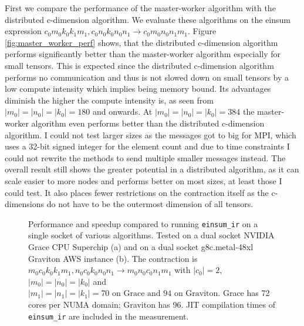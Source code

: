 First we compare the performance of the master-worker algorithm with the distributed c-dimension algorithm.
We evaluate these algorithms on the einsum expression $c_0m_0k_0k_1m_1, c_0n_0k_0n_0n_1 \rightarrow c_0m_0n_0n_1m_1$.
Figure \ref{fig:master_worker_perf} shows, that the distributed c-dimension algorithm performs significantly better than the master-worker algorithm especially for small tensors.
This is expected since the distributed c-dimension algorithm performs no communication and thus is not slowed down on small tensors by a low compute intensity which implies being memory bound.
Its advantages diminish the higher the compute intensity is, as seen from $|m_0|=|n_0|=|k_0|= 180$ and onwards.
At $|m_0|=|n_0|=|k_0|= 384$ the master-worker algorithm even performs better than the distributed c-dimension algorithm.
I could not test larger sizes as the messages got to big for MPI, which uses a 32-bit signed integer for the element count and due to time constraints I could not rewrite the methods to send multiple smaller messages instead.
The overall result still shows the greater potential in a distributed algorithm, as it can scale easier to more nodes and performs better on most sizes, at least those I could test.
It also places fewer restrictions on the contraction itself as the c-dimensions do not have to be the outermost dimension of all tensors.

\begin{figure}[ht]
  \centering
    \begin{subfigure}[t]{1\textwidth}
      
    \end{subfigure}
  \caption{
    Performance and speedup compared to running \texttt{einsum\_ir} on a single socket of various algorithms.
    Tested on a dual socket NVIDIA Grace CPU Superchip (a) and on a dual socket g8c.metal-48xl Graviton AWS instance (b).
    The contraction is $m_0c_0k_0k_1m_1, n_0c_0k_0n_0n_1 \rightarrow m_0n_0c_0n_1m_1$ with $|c_0|=2$, $|m_0|=|n_0|=|k_0|$ and $|m_1|=|n_1|=|k_1|=70\text{ on Grace and } 94\text{ on Graviton}$.
    Grace has 72 cores per NUMA domain; Graviton has 96.
    JIT compilation times of \texttt{einsum\_ir} are included in the measurement.
    }
  \label{fig:einsum_ir_perf}
\end{figure}

